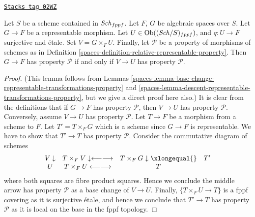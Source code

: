 \begin{lemma}
\label{spaces-lemma-representable-morphisms-spaces-property}
\href{https://stacks.math.columbia.edu/tag/02WZ}{\texttt{Stacks tag 02WZ}}

Let $S$ be a scheme contained in $\mathit{Sch}_{fppf}$.
Let $F$, $G$ be algebraic spaces over $S$.
Let $G \to F$ be a representable morphism.
Let $U \in \operatorname{Ob}((\mathit{Sch}/S)_{fppf})$, and $q : U \to F$
surjective and \'etale. Set $V = G \times_F U$.
Finally, let $\mathcal{P}$ be a property of morphisms
of schemes as in Definition \ref{spaces-definition-relative-representable-property}.
Then $G \to F$ has property $\mathcal{P}$ if and only if
$V \to U$ has property $\mathcal{P}$.
\end{lemma}

\begin{proof}

(This lemma follows from
Lemmas \ref{spaces-lemma-base-change-representable-transformations-property} and
\ref{spaces-lemma-descent-representable-transformations-property},
but we give a direct proof here also.)
It is clear from the definitions that if $G \to F$ has property
$\mathcal{P}$, then $V \to U$ has property $\mathcal{P}$.
Conversely, assume $V \to U$ has property $\mathcal{P}$.
Let $T \to F$ be a morphism from a scheme to $F$.
Let $T' = T \times_F G$ which is a scheme since $G \to F$ is
representable. We have to show that $T' \to T$ has property $\mathcal{P}$.
Consider the commutative diagram of schemes
$$
\begin{array}{cccc}V \downarrow & T \times_F V \downarrow\longleftarrow\longrightarrow & T \times_F G \downarrow\xlongequal{} & T' \\ U & T \times_F U \longleftarrow\longrightarrow & T & \end{array}
$$
where both squares are fibre product squares. Hence we conclude
the middle arrow has property $\mathcal{P}$ as a base change
of $V \to U$. Finally, $\{T \times_F U \to T\}$ is a fppf covering
as it is surjective \'etale, and hence we conclude that
$T' \to T$ has property $\mathcal{P}$ as it is local on the
base in the fppf topology.
\end{proof}

